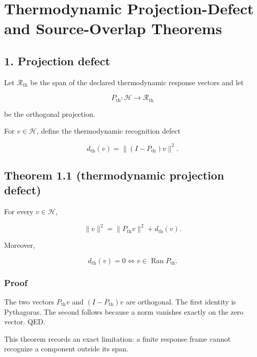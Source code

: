 \hypertarget{thermodynamic-projection-defect-and-source-overlap-theorems}{%
\chapter{Thermodynamic Projection-Defect and Source-Overlap Theorems}\label{thermodynamic-projection-defect-and-source-overlap-theorems}}

\hypertarget{projection-defect}{%
\section{1. Projection defect}\label{projection-defect}}

Let \(\mathcal R_{\mathrm{th}}\) be the span of the declared thermodynamic response vectors and let

\[
P_{\mathrm{th}}:\mathcal H\to\mathcal R_{\mathrm{th}}
\]

be the orthogonal projection.

For \(v\in\mathcal H\), define the thermodynamic recognition defect

\[
\boxed{
d_{\mathrm{th}}(v)=\|(I-P_{\mathrm{th}})v\|^2.
}
\]

\hypertarget{theorem-1.1-thermodynamic-projection-defect}{%
\section{Theorem 1.1 (thermodynamic projection defect)}\label{theorem-1.1-thermodynamic-projection-defect}}

For every \(v\in\mathcal H\),

\[
\boxed{
\|v\|^2
=\|P_{\mathrm{th}}v\|^2+d_{\mathrm{th}}(v).
}
\]

Moreover,

\[
\boxed{
d_{\mathrm{th}}(v)=0
\iff
v\in\operatorname{Ran}P_{\mathrm{th}}.
}
\]

\hypertarget{proof}{%
\subsection{Proof}\label{proof}}

The two vectors \(P_{\mathrm{th}}v\) and \((I-P_{\mathrm{th}})v\) are orthogonal. The first identity is Pythagoras. The second follows because a norm vanishes exactly on the zero vector. QED.

This theorem records an exact limitation: a finite response frame cannot recognize a component outside its span.


